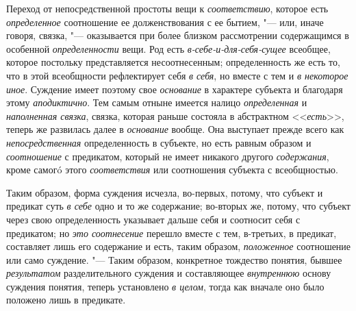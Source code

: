 Переход от непосредственной простоты вещи к
{\em соответствию},
которое есть
{\em определенное}
соотношение ее долженствования с ее бытием, "---
или, иначе говоря, связка, "--- оказывается при
более близком рассмотрении содержащимся в особенной
{\em определенности}
вещи. Род есть
{\em в-себе-и-для-себя-сущее}
всеобщее, которое постольку представляется несоотнесенным;
определенность же есть то, что в этой всеобщности рефлектирует себя
{\em в себя}, но вместе с
тем и {\em в некоторое иное}.
Суждение имеет поэтому свое
{\em основание} в
характере субъекта и благодаря этому
{\em аподиктично}. Тем
самым отныне имеется налицо
{\em определенная} и
{\em наполненная связка},
связка, которая раньше состояла в абстрактном
<<{\em есть}>>, теперь же
развилась далее в {\em основание}
вообще. Она выступает прежде всего как
{\em непосредственная}
определенность в субъекте, но есть равным образом и
{\em соотношение} с
предикатом, который не имеет никакого другого
{\em содержания}, кроме
самогó этого {\em соответствия}
или соотношения субъекта с всеобщностью.

Таким образом, форма суждения исчезла, во-первых, потому, что
субъект и предикат суть {\em в себе}
одно и то же содержание; во-вторых же, потому, что субъект
через свою определенность указывает дальше себя и соотносит себя с
предикатом; но {\em это соотнесение}
перешло вместе с тем, в-третьих, в предикат, составляет лишь
его содержание и есть, таким образом,
{\em положенное}
соотношение или само суждение. "--- Таким
образом, конкретное тождество понятия, бывшее
{\em результатом}
разделительного суждения и составляющее
{\em внутреннюю} основу
суждения понятия, теперь установлено
{\em в целом}, тогда как
вначале оно было положено лишь в предикате.

